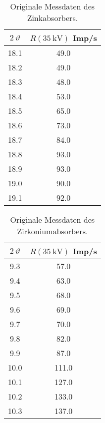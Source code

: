 \begin{table}[H]
    \caption{Originale Messdaten des Zinkabsorbers.}
    \centering
    \label{tab:origDaten5}
    \begin{tabular}{c c}
        \toprule
        $2~\vartheta$ & $R(\SI{35}{\kilo\volt})$ Imp/s \\
        \midrule
        18.1  &  49.0  \\
        18.2  &  49.0  \\
        18.3  &  48.0  \\
        18.4  &  53.0  \\
        18.5  &  65.0  \\
        18.6  &  73.0  \\
        18.7  &  84.0  \\
        18.8  &  93.0  \\
        18.9  &  93.0  \\
        19.0  &  90.0  \\
        19.1  &  92.0  \\
    \end{tabular}
\end{table}

\begin{table}[H]
    \caption{Originale Messdaten des Zirkoniumabsorbers.}
    \centering
    \label{tab:origDaten6}
    \begin{tabular}{c c}
        \toprule
        $2~\vartheta$ & $R(\SI{35}{\kilo\volt})$ Imp/s \\
        \midrule
        9.3  &  57.0  \\
        9.4  &  63.0  \\
        9.5  &  68.0  \\
        9.6  &  69.0  \\
        9.7  &  70.0  \\
        9.8  &  82.0  \\
        9.9  &  87.0  \\
        10.0  &  111.0  \\
        10.1  &  127.0  \\
        10.2  &  133.0  \\
        10.3  &  137.0  \\
    \end{tabular}
\end{table}
